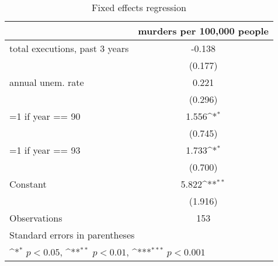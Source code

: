 \begin{table}[htbp]\centering
\def\sym#1{\ifmmode^{#1}\else\(^{#1}\)\fi}
\caption{Fixed effects regression}
\begin{tabular}{l*{1}{c}}
\hline\hline
                    &\multicolumn{1}{c}{murders per 100,000 people}\\
\hline
total executions, past 3 years&      -0.138         \\
                    &     (0.177)         \\
[1em]
annual unem. rate   &       0.221         \\
                    &     (0.296)         \\
[1em]
=1 if year == 90    &       1.556\sym{*}  \\
                    &     (0.745)         \\
[1em]
=1 if year == 93    &       1.733\sym{*}  \\
                    &     (0.700)         \\
[1em]
Constant            &       5.822\sym{**} \\
                    &     (1.916)         \\
\hline
Observations        &         153         \\
\hline\hline
\multicolumn{2}{l}{\footnotesize Standard errors in parentheses}\\
\multicolumn{2}{l}{\footnotesize \sym{*} \(p<0.05\), \sym{**} \(p<0.01\), \sym{***} \(p<0.001\)}\\
\end{tabular}
\end{table}
